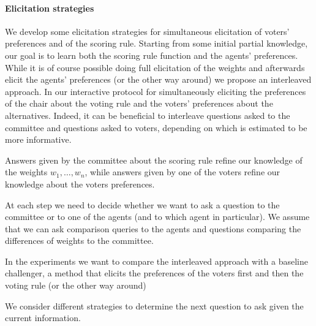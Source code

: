 \paragraph{Elicitation strategies}

We develop some elicitation strategies for simultaneous elicitation of voters' preferences and of the scoring rule.
Starting from some initial partial knowledge, our goal is to learn both the scoring rule function and the agents' preferences.
While it is of course possible doing full elicitation of the weights and afterwards elicit the agents' preferences (or the other way around) we propose an interleaved approach.
In our interactive  protocol for simultaneously eliciting the preferences of the chair about the voting rule and the voters' preferences about the alternatives.
Indeed, it can be beneficial to interleave questions asked to the committee and questions asked to voters, depending on which is estimated to be more informative.

Answers given by the committee about the scoring rule refine our knowledge of the weights $w_1,\ldots,w_n$, while
answers given by one of the voters refine our knowledge about the voters preferences.

At each step we need to decide whether we want to ask a question to the committee or to one of the agents (and to which agent in particular). We assume that we can ask comparison queries to the agents and questions comparing the differences of weights to the committee. 

In the experiments we want to compare the interleaved approach with a baseline challenger, a method  that elicits the preferences of the voters first and then the voting rule (or the other way around)


We consider different strategies to determine the next question to ask given the current information.

